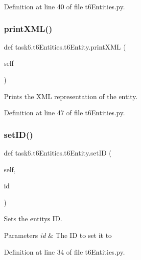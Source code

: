 Definition at line 40 of file t6\+Entities.\+py.

\mbox{\label{classtask6_1_1t6Entities_1_1t6Entity_acd1af6b899f68fec07c9749e5d0129fa}} 
\subsubsection{\texorpdfstring{print\+X\+M\+L()}{printXML()}}
{\footnotesize\ttfamily def task6.\+t6\+Entities.\+t6\+Entity.\+print\+X\+ML (\begin{DoxyParamCaption}\item[{}]{self }\end{DoxyParamCaption})}



Prints the X\+ML representation of the entity. 



Definition at line 47 of file t6\+Entities.\+py.

\mbox{\label{classtask6_1_1t6Entities_1_1t6Entity_a5387d85b2aa40e213b9962470207bd09}} 
\subsubsection{\texorpdfstring{set\+I\+D()}{setID()}}
{\footnotesize\ttfamily def task6.\+t6\+Entities.\+t6\+Entity.\+set\+ID (\begin{DoxyParamCaption}\item[{}]{self,  }\item[{}]{id }\end{DoxyParamCaption})}



Sets the entity\textquotesingle{}s ID. 


\begin{DoxyParams}{Parameters}
{\em id} & The ID to set it to \\
\hline
\end{DoxyParams}


Definition at line 34 of file t6\+Entities.\+py.



